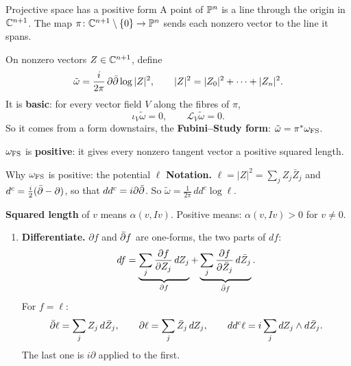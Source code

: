 \begin{frame}{Projective space has a positive form}
A point of \(\mathbb P^n\) is a line through the origin in \(\mathbb C^{n+1}\). The map \(\pi\colon\mathbb C^{n+1}\setminus\{0\}\to\mathbb P^n\) sends each nonzero vector to the line it spans.
\par\medskip
On nonzero vectors \(Z\in\mathbb C^{n+1}\), define
\[
\tilde\omega=\frac{i}{2\pi}\,\partial\bar\partial\log|Z|^2,\qquad |Z|^2=|Z_0|^2+\cdots+|Z_n|^2.
\]
It is \textbf{basic}: for every vector field \(V\) along the fibres of \(\pi\),
\[
\iota_V\tilde\omega=0,\qquad \mathcal L_V\tilde\omega=0.
\]
So it comes from a form downstairs, the \textbf{Fubini--Study form}: \(\tilde\omega=\pi^*\omega_{\rm FS}\).
\par\medskip
\(\omega_{\rm FS}\) is \textbf{positive}: it gives every nonzero tangent vector a positive squared length.
\end{frame}

\begin{frame}{Why \(\omega_{\rm FS}\) is positive: the potential \(\ell\)}
\label{fr:fs-positive}
\textbf{Notation.} \(\ell=|Z|^2=\sum_j Z_j\bar Z_j\) and \(d^c=\frac{i}{2}(\bar\partial-\partial)\), so that \(dd^c=i\partial\bar\partial\). So \(\tilde\omega=\frac{1}{2\pi}\,dd^c\log\ell\).
\par\smallskip
\textbf{Squared length} of \(v\) means \(\alpha(v,Iv)\). Positive means: \(\alpha(v,Iv)>0\) for \(v\ne0\).
\begin{enumerate}
\item \textbf{Differentiate.} \(\partial f\) and \(\bar\partial f\) are one-forms, the two parts of \(df\):
\[
df=\underbrace{\sum_j\frac{\partial f}{\partial Z_j}\,dZ_j}_{\partial f}+\underbrace{\sum_j\frac{\partial f}{\partial\bar Z_j}\,d\bar Z_j}_{\bar\partial f}.
\]
For \(f=\ell\):
\[
\bar\partial\ell=\sum_j Z_j\,d\bar Z_j,\qquad
\partial\ell=\sum_j \bar Z_j\,dZ_j,\qquad
dd^c\ell=i\sum_j dZ_j\wedge d\bar Z_j.
\]
The last one is \(i\partial\) applied to the first.
\end{enumerate}
\end{frame}

